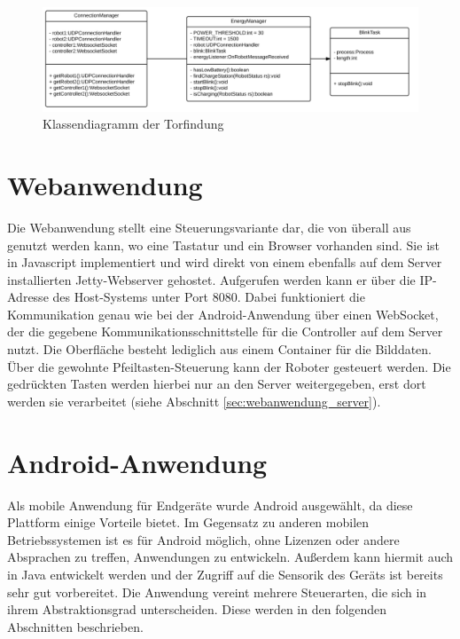 \begin{figure}[!h]
	\includegraphics[width=\textwidth]{images/uml_energymanager.pdf}
	\caption{Klassendiagramm der Torfindung}
	\label{fig:uml_energymanager}
\end{figure}




\section{Webanwendung}
\label{sec:webanwendung_anwendung}

Die Webanwendung stellt eine Steuerungsvariante dar, die von überall aus genutzt werden kann, wo eine Tastatur und ein Browser vorhanden sind. Sie ist in Javascript implementiert und wird direkt von einem ebenfalls auf dem Server installierten Jetty-Webserver gehostet. Aufgerufen werden kann er über die IP-Adresse des Host-Systems unter Port 8080. Dabei funktioniert die Kommunikation genau wie bei der Android-Anwendung über einen WebSocket, der die gegebene Kommunikationsschnittstelle für die Controller auf dem Server nutzt. 
Die Oberfläche besteht lediglich aus einem Container für die Bilddaten. 
Über die gewohnte Pfeiltasten-Steuerung kann der Roboter gesteuert werden. Die gedrückten Tasten werden hierbei nur an den Server weitergegeben, erst dort werden sie verarbeitet (siehe Abschnitt \ref{sec:webanwendung_server}).

\section{Android-Anwendung}
Als mobile Anwendung für Endgeräte wurde Android ausgewählt, da diese Plattform einige Vorteile bietet. Im Gegensatz zu anderen mobilen Betriebssystemen ist es für Android möglich, ohne Lizenzen oder andere Absprachen zu treffen, Anwendungen zu entwickeln. Außerdem kann hiermit auch in Java entwickelt werden und der Zugriff auf die Sensorik des Geräts ist bereits sehr gut vorbereitet. 
Die Anwendung vereint mehrere Steuerarten, die sich in ihrem Abstraktionsgrad unterscheiden. Diese werden in den folgenden Abschnitten beschrieben.


